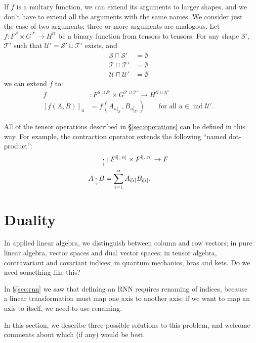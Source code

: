 \documentclass{article}
\DeclareMathOperator{\tupleshape}{ind}
\newcommand{\tuplerestrict}[2]{\left.#1\right|_{#2}}
\begin{document}
If $f$ is a multary function, we can extend its arguments to larger shapes, and we don't have to extend all the arguments with the same names. We consider just the case of two arguments; three or more arguments are analogous. Let $f \colon F^{\mathcal{S}} \times G^{\mathcal{T}} \rightarrow H^{\mathcal{U}}$ be a binary function from tensors to tensors. For any shape $\mathcal{S'}$, $\mathcal{T'}$ such that $\mathcal{U'} = \mathcal{S'} \sqcup \mathcal{T'}$ exists, and 
\begin{align*}
\mathcal{S} \sqcap \mathcal{S'} &= \emptyset \\
\mathcal{T} \sqcap \mathcal{T'} &= \emptyset \\
\mathcal{U} \sqcap \mathcal{U'} &= \emptyset \end{align*}
we can extend $f$ to:
\begin{align*}
f &: F^{\mathcal{S} \sqcup \mathcal{S'}} \times G^{\mathcal{T} \sqcup \mathcal{T'}} \rightarrow H^{\mathcal{U} \sqcup \mathcal{U'}} \\
  [f(A,B)]_u &= f\left(A_{\tuplerestrict{u}{\mathcal{S'}}},B_{\tuplerestrict{u}{\mathcal{T'}}}\right) \qquad \text{for all $u \in \tupleshape\mathcal{U'}$.}
\end{align*}

All of the tensor operations described in \S\ref{sec:operations} can be defined in this way. For example, the contraction operator extends the following ``named dot-product'':
\begin{align*}
\mathbin{\mathop{\boldsymbol\cdot}\limits_{\mathsf{i}}} &: F^{\mathsf{i}[..n]} \times F^{\mathsf{i}[..n]} \rightarrow F \\
A \mathbin{\mathop{\boldsymbol\cdot}\limits_{\mathsf{i}}} B &= \sum_{i=1}^n A_{\mathsf{i}[i]} B_{\mathsf{i}[i]}.
\end{align*}

\section{Duality}
\label{sec:duality}

In applied linear algebra, we distinguish between column and row vectors; in pure linear algebra, vector spaces and dual vector spaces; in tensor algebra, contravariant and covariant indices; in quantum mechanics, bras and kets. Do we need something like this?

In \S\ref{sec:rnn} we saw that defining an RNN requires renaming of indices, because a linear transformation must map one axis to another axis; if we want to map an axis to itself, we need to use renaming.

In this section, we describe three possible solutions to this problem, and welcome comments about which (if any) would be best.
\end{document}
